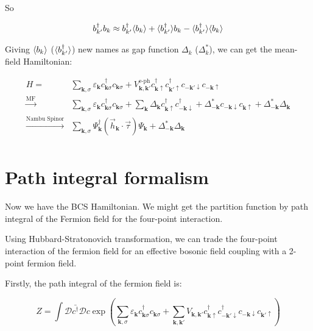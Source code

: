 \documentclass[14pt, a4paper]{extarticle}
\DeclarePairedDelimiter\avg{\langle}{\rangle}
\begin{document}
So

\begin{equation}
    b^\dagger_{k'} b_{k} \approx b^\dagger_{k'} \avg{b_{k}} + \avg{b^\dagger_{k'}} b_{k} - \avg{b^\dagger_{k'}} \avg{b_{k}}
\end{equation}

Giving $ \avg{b_{k}} $  ($\avg{b^\dagger_{k'}} $) new names as gap function $\Delta_{k}$ ($\Delta^*_{k}$), we can get the mean-field Hamiltonian:

\begin{align}
    H  = & \sum_{\mathbf{k}, \sigma} \varepsilon_{\mathbf{k}} c_{\mathbf{k}\sigma}^\dagger c_{\mathbf{k}\sigma} + V^{\text{e-ph}}_{\mathbf{k}, \mathbf{k'}} c^\dagger_{\mathbf{k}\uparrow} c^\dagger_{\mathbf{k'}\uparrow} c_{-\mathbf{k'}\downarrow} c_{-\mathbf{k}\uparrow} \\
    \xrightarrow{\text{MF}} & \sum_{\mathbf{k}, \sigma} \varepsilon_{\mathbf{k}} c_{\mathbf{k}\sigma}^\dagger c_{\mathbf{k}\sigma} + \sum_{\mathbf{k}} \Delta_{\mathbf{k}} c_{\mathbf{k}\uparrow}^\dagger c_{-\mathbf{k}\downarrow}^\dagger + \Delta^*_{-\mathbf{k}} c_{-\mathbf{k}\downarrow} c_{\mathbf{k}\uparrow} + \Delta^*_{-\mathbf{k}} \Delta_{\mathbf{k}} \\
    \xrightarrow{\text{Nambu Spinor}} & \sum_{\mathbf{k}, \sigma} \Psi_{\mathbf{k}}^{\dagger} (\vec{h}_{\mathbf{k}} \cdot \vec{\tau}) \Psi_{\mathbf{k}} + \Delta^*_{-\mathbf{k}} \Delta_{\mathbf{k}} \\
\end{align}

\section{Path integral formalism}

Now we have the BCS Hamiltonian. We might get the partition function by path integral of the Fermion field for the four-point interaction.

Using Hubbard-Stratonovich transformation, we can trade the four-point interaction of the fermion field for an effective bosonic field coupling with a 2-point fermion field.

Firstly, the path integral of the fermion field is:

\begin{equation}
    Z = \int \mathcal{D} \bar{c^\dagger} \mathcal{D} c \exp 
    \left( \sum_{\mathbf{k}, \sigma} \varepsilon_{\mathbf{k}} c_{\mathbf{k}\sigma}^\dagger c_{\mathbf{k}\sigma} + \sum_{\mathbf{k}, \mathbf{k'}} V_{\mathbf{k}, \mathbf{k'}} c_{\mathbf{k}\uparrow}^\dagger c_{-\mathbf{k'}\downarrow}^\dagger c_{-\mathbf{k}\downarrow} c_{\mathbf{k'}\uparrow} \right)
\end{equation}
\end{document}
